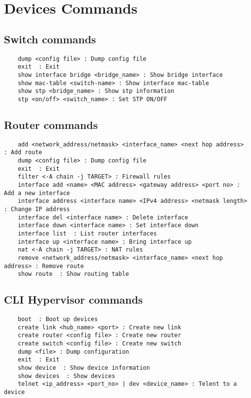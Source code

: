 \chapter{Devices Commands}
\label{ch:commands}
\section{Switch commands}
\lstset{language=TeX,caption= ,label=lst:sw-commands}
\begin{lstlisting}
	dump <config file> : Dump config file
	exit  : Exit
	show interface bridge <bridge_name> : Show bridge interface
	show mac-table <switch-name> : Show interface mac-table
	show stp <bridge_name> : Show stp information
	stp <on/off> <switch_name> : Set STP ON/OFF
\end{lstlisting}
\section{Router commands}
\lstset{language=TeX,caption= ,label=lst:sw-commands}
\begin{lstlisting}
	add <network_address/netmask> <interface_name> <next hop address> : Add route
	dump <config file> : Dump config file
	exit  : Exit
	filter <-A chain -j TARGET> : Firewall rules
	interface add <name> <MAC address> <gateway address> <port no> : Add a new interface
	interface address <interface name> <IPv4 address> <netmask length> : Change IP address
	interface del <interface name> : Delete interface
	interface down <interface name> : Set interface down
	interface list  : List router interfaces
	interface up <interface name> : Bring interface up
	nat <-A chain -j TARGET> : NAT rules
	remove <network_address/netmask> <interface_name> <next hop address> : Remove route
	show route  : Show routing table
\end{lstlisting}
\section{CLI Hypervisor commands}
\lstset{language=TeX,caption=,label=lst:sw-commands}
\begin{lstlisting}
	boot  : Boot up devices
	create link <hub_name> <port> : Create new link
	create router <config file> : Create new router
	create switch <config file> : Create new switch
	dump <file> : Dump configuration
	exit  : Exit
	show device  : Show device information
	show devices  : Show devices
	telnet <ip_address> <port_no> | dev <device_name> : Telent to a device
\end{lstlisting}
